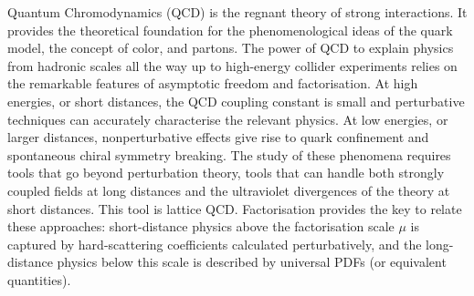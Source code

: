Quantum Chromodynamics (QCD) is the regnant theory of strong interactions. It provides the 
theoretical foundation 
for the phenomenological ideas of the quark model, the concept of color, and partons. 
The power of QCD to explain physics from hadronic scales all the way up to high-energy collider
experiments relies on the remarkable features of asymptotic freedom and factorisation.
At high energies, or short distances, the QCD coupling constant is small and perturbative
techniques can accurately characterise the relevant physics. At low energies, or larger
distances, nonperturbative effects give rise to quark confinement and spontaneous chiral symmetry breaking. 
The study of these phenomena requires tools that go beyond perturbation theory, tools that can handle both strongly
coupled fields at long distances and the ultraviolet divergences of
the theory at short distances. This tool is lattice QCD. Factorisation provides the key to relate these
approaches: short-distance physics above the factorisation scale $\mu$ is captured by hard-scattering
coefficients calculated perturbatively, and the long-distance physics below this scale is described
by universal PDFs (or equivalent quantities). %

